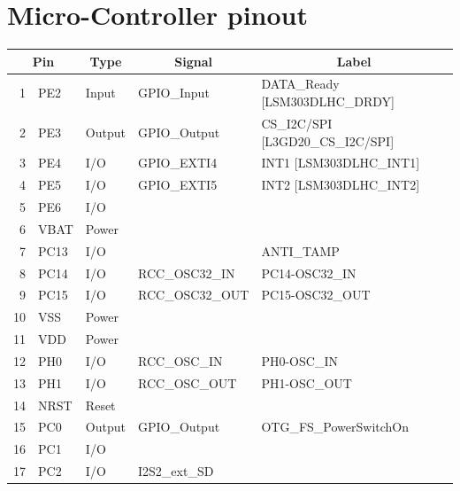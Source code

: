 \documentclass[12pt,a4paper]{report}
\begin{document}
\chapter{Micro-Controller pinout}
\small
\begin{longtable}[c]{|r|l|l|r|r|}
		
		\hline
		\multicolumn{2}{|c|}{\textbf{Pin}} & \multicolumn{1}{c|}{\textbf{Type}} & \multicolumn{1}{c|}{\textbf{Signal}} & \multicolumn{1}{c|}{\textbf{Label}} \\
		\hline
		\endhead
		1     & PE2   & Input & \multicolumn{1}{l|}{GPIO\_Input} & \multicolumn{1}{l|}{DATA\_Ready [LSM303DLHC\_DRDY]} \\
		\hline
		2     & PE3   & Output & \multicolumn{1}{l|}{GPIO\_Output} & \multicolumn{1}{l|}{CS\_I2C/SPI [L3GD20\_CS\_I2C/SPI]} \\
		\hline
		3     & PE4   & I/O   & \multicolumn{1}{l|}{GPIO\_EXTI4} & \multicolumn{1}{l|}{INT1 [LSM303DLHC\_INT1]} \\
		\hline
		4     & PE5   & I/O   & \multicolumn{1}{l|}{GPIO\_EXTI5} & \multicolumn{1}{l|}{INT2 [LSM303DLHC\_INT2]} \\
		\hline
		5     & PE6   & I/O   &       &  \\
		\hline
		6     & VBAT  & Power &       &  \\
		\hline
		7     & PC13 & I/O   &       & \multicolumn{1}{l|}{ANTI\_TAMP} \\
		\hline
		8     & PC14 & I/O   & \multicolumn{1}{l|}{RCC\_OSC32\_IN} & \multicolumn{1}{l|}{PC14-OSC32\_IN} \\
		\hline
		9     & PC15 & I/O   & \multicolumn{1}{l|}{RCC\_OSC32\_OUT} & \multicolumn{1}{l|}{PC15-OSC32\_OUT} \\
		\hline
		10    & VSS   & Power &       &  \\
		\hline
		11    & VDD   & Power &       &  \\
		\hline
		12    & PH0& I/O   & \multicolumn{1}{l|}{RCC\_OSC\_IN} & \multicolumn{1}{l|}{PH0-OSC\_IN} \\
		\hline
		13    & PH1 & I/O   & \multicolumn{1}{l|}{RCC\_OSC\_OUT} & \multicolumn{1}{l|}{PH1-OSC\_OUT} \\
		\hline
		14    & NRST  & Reset &       &  \\
		\hline
		15    & PC0   & Output & \multicolumn{1}{l|}{GPIO\_Output} & \multicolumn{1}{l|}{OTG\_FS\_PowerSwitchOn} \\
		\hline
		16    & PC1   & I/O   &       &  \\
		\hline
		17    & PC2   & I/O   & \multicolumn{1}{l|}{I2S2\_ext\_SD} &  \\

\end{longtable}
\end{document}
